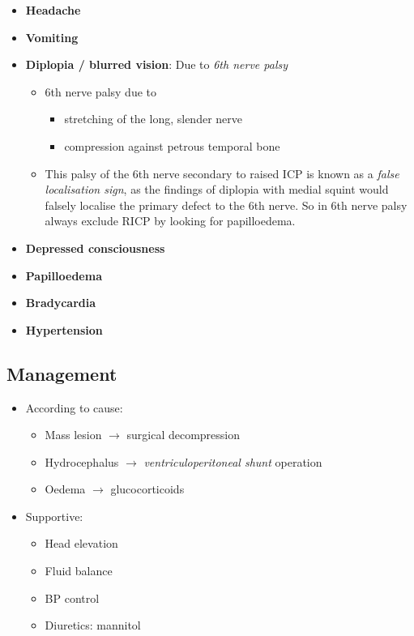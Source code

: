 \documentclass[
  12pt,
]{memoir}
\providecommand{\tightlist}{%
  \setlength{\itemsep}{0pt}\setlength{\parskip}{0pt}}
\begin{document}
\begin{itemize}
\tightlist
\item
  \textbf{Headache}
\item
  \textbf{Vomiting}
\item
  \textbf{Diplopia / blurred vision}: Due to \emph{6th nerve palsy}

  \begin{itemize}
  \tightlist
  \item
    6th nerve palsy due to

    \begin{itemize}
    \tightlist
    \item
      stretching of the long, slender nerve
    \item
      compression against petrous temporal bone
    \end{itemize}
  \item
    This palsy of the 6th nerve secondary to raised ICP is known as a
    \emph{false localisation sign}, as the findings of diplopia with
    medial squint would falsely localise the primary defect to the 6th
    nerve. So in 6th nerve palsy always exclude RICP by looking for
    papilloedema.
  \end{itemize}
\item
  \textbf{Depressed consciousness}
\item
  \textbf{Papilloedema}
\item
  \textbf{Bradycardia}
\item
  \textbf{Hypertension}
\end{itemize}

\hypertarget{management-1}{%
\subsection{Management}\label{management-1}}

\begin{itemize}
\tightlist
\item
  According to cause:

  \begin{itemize}
  \tightlist
  \item
    Mass lesion \(\rightarrow\) surgical decompression
  \item
    Hydrocephalus \(\rightarrow\) \emph{ventriculoperitoneal shunt}
    operation
  \item
    Oedema \(\rightarrow\) glucocorticoids
  \end{itemize}
\item
  Supportive:

  \begin{itemize}
  \tightlist
  \item
    Head elevation
  \item
    Fluid balance
  \item
    BP control
  \item
    Diuretics: mannitol
  \end{itemize}
\end{itemize}
\end{document}
